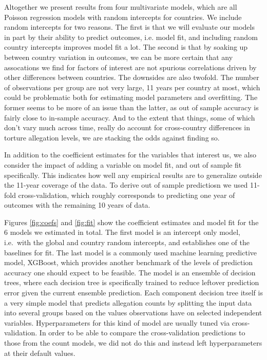 \documentclass[11pt]{article}
\begin{document}
Altogether we present results from four multivariate models, which are all Poisson regression models with random intercepts for countries. We include random intercepts for two reasons. The first is that we will evaluate our models in part by their ability to predict outcomes, i.e. model fit, and including random country intercepts improves model fit a lot. The second is that by soaking up between country variation in outcomes, we can be more certain that any assocations we find for factors of interest are not spurious correlations driven by other differences between countries. The downsides are also twofold. The number of observations per group are not very large, 11 years per country at most, which could be problematic both for estimating model parameters and overfitting. The former seems to be more of an issue than the latter, as out of sample accuracy is fairly close to in-sample accuracy. And to the extent that things, some of which don't vary much across time, really do account for cross-country differences in torture allegation levels, we are stacking the odds against finding so. 

In addition to the coefficient estimates for the variables that interest us, we also consider the impact of adding a variable on model fit, and out of sample fit specifically. This indicates how well any empirical results are to generalize outside the 11-year coverage of the data. To derive out of sample predictiosn we used 11-fold cross-validation, which roughly corresponds to predicting one year of outcomes with the remaining 10 years of data. 

Figures \ref{fig:coefs} and \ref{fig:fit} show the coefficient estimates and model fit for the 6 models we estimated in total. The first model is an intercept only model, i.e.\ with the global and country random intercepts, and establishes one of the baselines for fit. The last model is a commonly used machine learning predictive model, XGBoost, which provides another benchmark of the levels of prediction accuracy one should expect to be feasible. The model is an ensemble of decision trees, where each decision tree is specifically trained to reduce leftover prediction error given the current ensemble prediction. Each component decision tree itself is a very simple model that predicts allegation counts by splitting the input data into several groups based on the values observations have on selected independent variables. Hyperparameters for this kind of model are usually tuned via cross-validation. In order to be able to compare the cross-validation predictions to those from the count models, we did not do this and instead left hyperparameters at their default values.

\clearpage
\begin{singlespace}


\end{singlespace}
\end{document}
